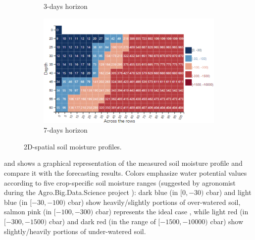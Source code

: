 \begin{figure}[t]
\begin{subfigure}[b]{0.47\textwidth}
        \caption{3-days horizon}
        \label{orchard-fig:profile_c}
    \end{subfigure}
    \hfill
    \begin{subfigure}[b]{0.47\textwidth}
        \includegraphics[width=\textwidth]{chapters/physics-aware/orchard/img/7gg_profile.pdf}
        \caption{7-days horizon}
        \label{orchard-fig:profile_d}
    \end{subfigure}
    \caption{2D-spatial soil moisture profiles.}
    \label{orchard-fig:profiles}
\end{figure}

 and   shows a graphical representation of the measured soil moisture profile and compare it with the forecasting results. Colors emphasize water potential values according to five crop-specific soil moisture ranges (suggested by agronomist during the Agro.Big.Data.Science project \cite{ABDS}): 
dark blue (in $[0, -30)$ cbar) and light blue (in $[-30, -100)$ cbar) show heavily/slightly portions of over-watered soil, salmon pink (in $[-100, -300)$ cbar) represents the ideal case \cite{miller1998effects}, while light red (in $[-300, -1500)$ cbar) and dark red (in the range of $[-1500, -10000)$ cbar) show slightly/heavily portions of under-watered soil.


